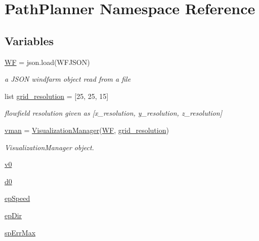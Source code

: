 \hypertarget{namespace_path_planner}{}\section{Path\+Planner Namespace Reference}
\label{namespace_path_planner}
\subsection*{Variables}
\begin{DoxyCompactItemize}
\item 
\mbox{\hyperlink{namespace_path_planner_a9c78b28f5fddaac500a5e4db2b78279e}{WF}} = json.\+load(W\+F\+J\+S\+ON)
\begin{DoxyCompactList}\small\item\em a J\+S\+ON windfarm object read from a file \end{DoxyCompactList}\item 
list \mbox{\hyperlink{namespace_path_planner_a528f4f5acdf39deff5b1d647a2a9c516}{grid\+\_\+resolution}} = \mbox{[}25, 25, 15\mbox{]}
\begin{DoxyCompactList}\small\item\em flowfield resolution given as \mbox{[}x\+\_\+resolution, y\+\_\+resolution, z\+\_\+resolution\mbox{]} \end{DoxyCompactList}\item 
\mbox{\hyperlink{namespace_path_planner_aeb46822ede819d38fe65ab788c4db880}{vman}} = \mbox{\hyperlink{classvisualization__manager___d_j_1_1_visualization_manager}{Visualization\+Manager}}(\mbox{\hyperlink{namespace_path_planner_a9c78b28f5fddaac500a5e4db2b78279e}{WF}}, \mbox{\hyperlink{namespace_path_planner_a528f4f5acdf39deff5b1d647a2a9c516}{grid\+\_\+resolution}})
\begin{DoxyCompactList}\small\item\em Visualization\+Manager object. \end{DoxyCompactList}\item 
\mbox{\hyperlink{namespace_path_planner_a40f708313656ecef4a5166fc9bdab1a2}{v0}}
\item 
\mbox{\hyperlink{namespace_path_planner_a447a1bffbd5244323bdbce245b375436}{d0}}
\item 
\mbox{\hyperlink{namespace_path_planner_a2d307a582d8d15bd5c43e6b7e0f42a58}{ep\+Speed}}
\item 
\mbox{\hyperlink{namespace_path_planner_a21862b83843c039cd3cc4b3123241406}{ep\+Dir}}
\item 
\mbox{\hyperlink{namespace_path_planner_ac38e0b1ad38a86577398aa6a7f2dae86}{sp\+Err\+Max}}

\end{DoxyCompactItemize}
